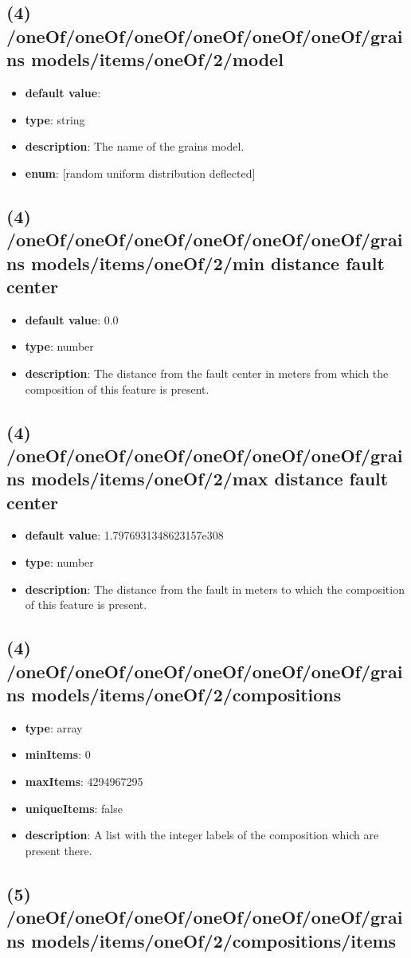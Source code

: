 \subsection{(4) /oneOf/oneOf/oneOf/oneOf/oneOf/oneOf/grains models/items/oneOf/2/model}
\begin{itemize}[leftmargin=4em]\item {\bf default value}: 
\item {\bf type}: string
\item {\bf description}: The name of the grains model.
\item {\bf enum}: [random uniform distribution deflected]\end{itemize}\subsection{(4) /oneOf/oneOf/oneOf/oneOf/oneOf/oneOf/grains models/items/oneOf/2/min distance fault center}
\begin{itemize}[leftmargin=4em]\item {\bf default value}: 0.0
\item {\bf type}: number
\item {\bf description}: The distance from the fault center in meters from which the composition of this feature is present.
\end{itemize}\subsection{(4) /oneOf/oneOf/oneOf/oneOf/oneOf/oneOf/grains models/items/oneOf/2/max distance fault center}
\begin{itemize}[leftmargin=4em]\item {\bf default value}: 1.7976931348623157e308
\item {\bf type}: number
\item {\bf description}: The distance from the fault in meters to which the composition of this feature is present.
\end{itemize}\subsection{(4) /oneOf/oneOf/oneOf/oneOf/oneOf/oneOf/grains models/items/oneOf/2/compositions}
\begin{itemize}[leftmargin=4em]\item {\bf type}: array
\item {\bf minItems}: 0
\item {\bf maxItems}: 4294967295
\item {\bf uniqueItems}: false
\item {\bf description}: A list with the integer labels of the composition which are present there.
\end{itemize}\subsection{(5) /oneOf/oneOf/oneOf/oneOf/oneOf/oneOf/grains models/items/oneOf/2/compositions/items}
